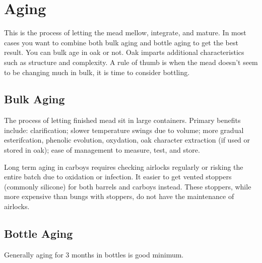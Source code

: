 \section{Aging}
 This is the process of letting the mead mellow, integrate, and mature. In most cases you want to combine both bulk aging
 and bottle aging to get the best result. You can bulk age in oak or not. Oak imparts additional characteristics such as 
 structure and complexity\cite{oskaar-in-a-nutshell}. 
 A rule of thumb is when the mead doesn't seem to be changing much in bulk, it is time to consider bottling.
 \subsection{Bulk Aging}
  The process of letting finished mead sit in large containers. Primary benefits include\cite{oskaar-in-a-nutshell}: 
  clarification; 
  slower temperature swings due to volume;
  more gradual esterifcation, phenolic evolution, oxydation, oak character extraction (if used or stored in oak);
  ease of management to measure, test, and store.

  Long term aging in carboys requires checking airlocks regularly or risking the entire batch due to oxidation or 
  infection. It easier to get vented stoppers (commonly silicone) for both barrels and carboys instead. These stoppers,
  while more expensive than bungs with stoppers, do not have the maintenance of airlocks.
 \subsection{Bottle Aging}
  Generally aging for 3 months in bottles is good minimum.

